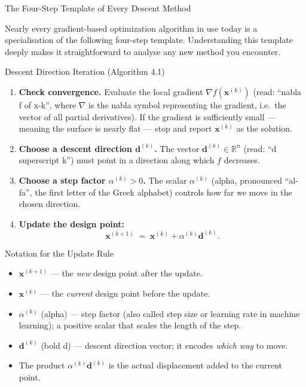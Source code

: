 \documentclass[aspectratio=169,10pt]{beamer}
\newcommand{\bx}{\mathbf{x}}
\newcommand{\bd}{\mathbf{d}}
\newcommand{\R}{\mathbb{R}}
\newcommand{\grad}{\nabla}
\begin{document}
\begin{frame}[allowframebreaks]{The Four-Step Template of Every Descent Method}

  Nearly every gradient-based optimization algorithm in use today is a
  specialisation of the following four-step template.  Understanding this
  template deeply makes it straightforward to analyse any new method you
  encounter.

  \begin{block}{Descent Direction Iteration (Algorithm 4.1)}
    \begin{enumerate}
      \item \textbf{Check convergence.}  Evaluate the local gradient
            $\grad f(\bx^{(k)})$ (read: ``nabla f of x-k'', where $\grad$
            is the nabla symbol representing the gradient, i.e.\ the
            vector of all partial derivatives).  If the gradient is
            sufficiently small --- meaning the surface is nearly flat ---
            stop and report $\bx^{(k)}$ as the solution.
      \item \textbf{Choose a descent direction $\bd^{(k)}$.}  The vector
            $\bd^{(k)} \in \R^n$ (read: ``d superscript k'') must point
            in a direction along which $f$ decreases.
      \item \textbf{Choose a step factor $\alpha^{(k)} > 0$.}  The scalar
            $\alpha^{(k)}$ (alpha, pronounced ``al-fa'', the first letter
            of the Greek alphabet) controls how far we move in the chosen
            direction.
      \item \textbf{Update the design point:}
            \[
              \bx^{(k+1)} \;=\; \bx^{(k)} + \alpha^{(k)}\bd^{(k)}.
            \]
    \end{enumerate}
  \end{block}

  \begin{block}{Notation for the Update Rule}
    \begin{itemize}
      \item $\bx^{(k+1)}$ --- the \emph{new} design point after the update.
      \item $\bx^{(k)}$ --- the \emph{current} design point before the update.
      \item $\alpha^{(k)}$ (alpha) --- step factor (also called step size
            or learning rate in machine learning); a positive scalar that
            scales the length of the step.
      \item $\bd^{(k)}$ (bold d) --- descent direction vector; it encodes
            \emph{which way} to move.
      \item The product $\alpha^{(k)}\bd^{(k)}$ is the actual displacement
            added to the current point.
    \end{itemize}
  \end{block}


\end{frame}
\end{document}
